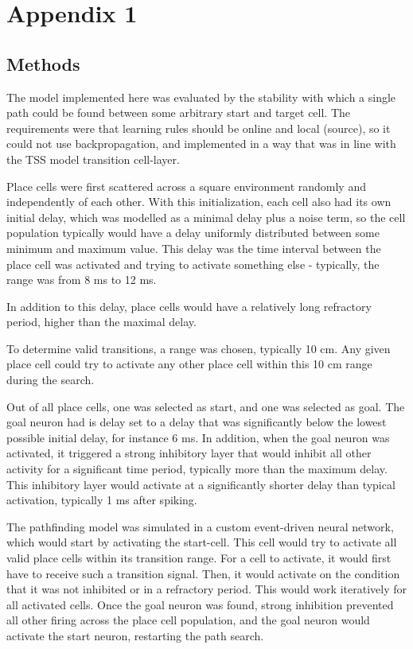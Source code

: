 \documentclass{article}
\begin{document}
\printbibliography

\appendix
\section{Appendix 1}
\subsection{Methods}
The model implemented here was evaluated by the stability with which a single path could be found between some arbitrary start and target cell. The requirements were that learning rules should be online and local (source), so it could not use backpropagation, and implemented in a way that was in line with the TSS model transition cell-layer.

Place cells were first scattered across a square environment randomly and independently of each other. With this initialization, each cell also had its own initial delay, which was modelled as a minimal delay plus a noise term, so the cell population typically would have a delay uniformly distributed between some minimum and maximum value. This delay was the time interval between the place cell was activated and trying to activate something else - typically, the range was from 8 ms to 12 ms.

In addition to this delay, place cells would have a relatively long refractory period, higher than the maximal delay.

To determine valid transitions, a range was chosen, typically 10 cm. Any given place cell could try to 
activate any other place cell within this 10 cm range during the search.

Out of all place cells, one was selected as start, and one was selected as goal. The goal neuron had is delay set to a delay that was significantly below the lowest possible initial delay, for instance 6 ms. In addition, when the goal neuron was activated, it triggered a strong inhibitory layer that would inhibit all other activity for a significant time period, typically more than the maximum delay. This inhibitory layer would activate at a significantly shorter delay than typical activation, typically 1 ms after spiking.

The pathfinding model was simulated in a custom event-driven neural network, which would start by activating the start-cell. This cell would try to activate all valid place cells within its transition range. For a cell to activate, it would first have to receive such a transition signal. Then, it would activate on the condition that it was not inhibited or in a refractory period.
This would work iteratively for all activated cells. Once the goal neuron was found, strong inhibition prevented all other firing across the place cell population, and the goal neuron would activate the start neuron, restarting the path search.
\end{document}
